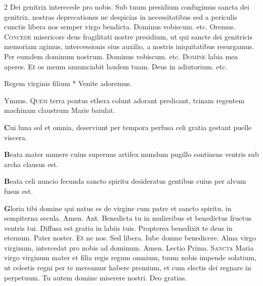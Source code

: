 \begin{multicols*}{2}
\newline \R Dei genitrix interecede pro nobis.
 Sub tuum presidium confugimus sancta dei genitrix, nostras deprecationes ne despicias in necessitatibus sed a periculis cunctis libera nos semper virgo bendicta. Dominus vobiscum. etc. Oremus.
\lettrine[lines=2]{\zallmancaps \color{Blue} C}{oncede} misericors deus fragilitati nostre presidium, ut qui sancte dei genitricis memoriam agimus, intercessionis eius auxilio, a nostris iniquitatibus resurgamus. Per eumdem dominum nostrum. Dominus vobiscum. etc.
{\color{Red} }
\lettrine[lines=2]{\zallmancaps \color{Red} D}{omine} labia mea aperes. Et os meum annunciabit laudem tuam. Deus in adiutorium. etc.
\begin{invitatory-full}
{Regem virginis filium * Venite adoremus.}
\end{invitatory-full}
{\color{Red} Ymnus.}
\lettrine[lines=2]{\zallmancaps \color{Red} Q}{uem} terra pontus ethera
colunt adorant predicant,
trinam regentem machinam
claustrum Marie baiulat.
\par {\bfseries \color{Red} C}ui luna sol et omnia,
deserviunt per tempora
perfusa celi gratia
gestant puelle viscera.
\par {\bfseries \color{Blue} B}eata mater munere
cuius supernus artifex
mundum pugillo continens
ventris sub archa clausus est.
\par {\bfseries \color{Red} B}eata celi nuncio
fecunda sancto spiritu
desideratus gentibus
cuius per alvum fusus est.
\par {\bfseries \color{Blue} G}loria tibi domine
qui natus es de virgine
cum patre et sancto spiritu,
in sempiterna secula. Amen.
{\color{Red} Ant.} Benedicta tu in mulieribus et benedictus fructus ventris tui.
\V Diffusa est gratia in labiis tuis. \R Propterea benedixit te deus in eternum. Pater noster. Et ne nos. Sed libera. Iube domne benedicere.
 Alma virgo virginum, intercedat pro nobis ad dominum. Amen. {\color{Red} Lectio Prima.}
\lettrine[lines=2]{\zallmancaps \color{Blue} S}{ancta} Maria virgo virginum mater et filia regis regum omnium, tuum nobis impende solatium, ut celestis regni per te mereamur habere premium, et cum electis dei regnare in perpetuum. Tu autem domine miserere nostri. Deo gratias.

\end{multicols*}
